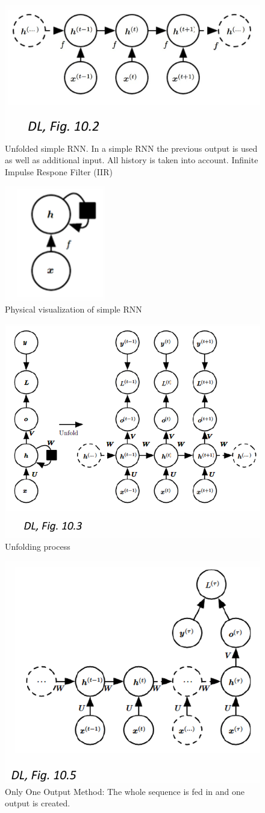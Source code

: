 \documentclass[../Main.tex]{subfiles}
\begin{document}
\begin{figure}[H]
    \centering
    \includegraphics[width=0.5\linewidth]{Images/deepl/rnn.png}
    \caption{Unfolded simple RNN. In a simple RNN the previous output is used as well as additional input. 
    All history is taken into account. Infinite Impulse Respone Filter (IIR)}
\end{figure}
\begin{figure}[H]
    \centering
    \includegraphics[width=0.15\linewidth]{Images/deepl/rnn-2.png}
    \caption{Physical visualization of simple RNN}
\end{figure}
\begin{figure}[H]
    \centering
    \includegraphics[width=0.5\linewidth]{Images/deepl/unfolding.png}
    \caption{Unfolding process}
\end{figure}
\begin{figure}[H]
    \centering
    \includegraphics[width=0.5\linewidth]{Images/deepl/rnn-only-one.png}
    \caption{Only One Output Method: The whole sequence is fed in and one output is created.}
\end{figure}
\end{document}
